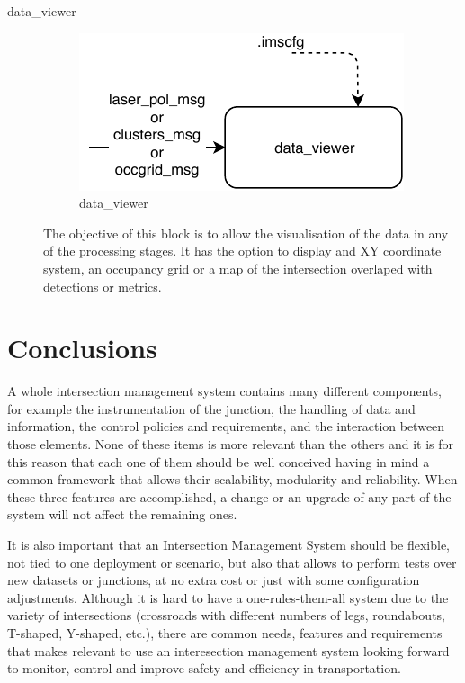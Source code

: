 \begin{description}

\item[data\_viewer] \hfill
\begin{figure}[ht!]
\centering
\includegraphics[scale=1]{fig/3/data_viewer.pdf}
\caption{data\_viewer}
\label{data_viewer}
\end{figure}

The objective of this block is to allow the visualisation of the data in any of the processing stages. It has the option to display and XY coordinate system, an occupancy grid or a map of the intersection overlaped with detections or metrics.

\end{description}

\section{Conclusions}

A whole intersection management system contains many different components, for example the instrumentation of the junction, the handling of data and information, the control policies and requirements, and the interaction between those elements. None of these items is more relevant than the others and it is for this reason that each one of them should be well conceived having in mind a common framework that allows their scalability, modularity and reliability. When these three features are accomplished, a change or an upgrade of any part of the system will not affect the remaining ones.

It is also important that an Intersection Management System should be flexible, not tied to one deployment or scenario, but also that allows to perform tests over new datasets or junctions, at no extra cost or just with some configuration adjustments. Although it is hard to have a one-rules-them-all system due to the variety of intersections (crossroads with different numbers of legs, roundabouts, T-shaped, Y-shaped, etc.), there are common needs, features and requirements that makes relevant to use an interesection management system looking forward to monitor, control and improve safety and efficiency in transportation.